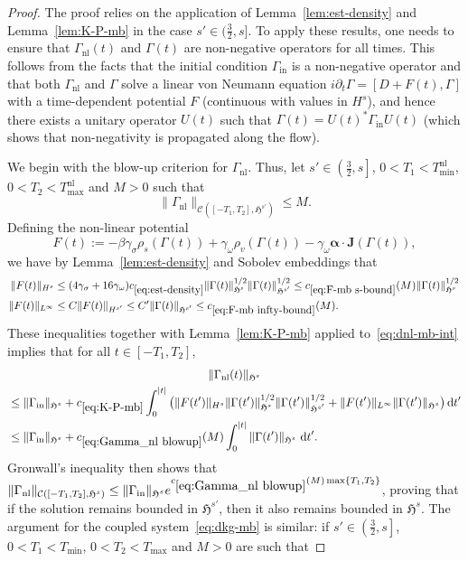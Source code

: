 \documentclass[AHL,Unicode,longabstracts,published]{cedram}
\newcommand{\rmin}{\mathrm{in}}
\newcommand{\nl}{\mathrm{nl}}
\newcommand{\cC}{\mathcal{C}}
\newcommand{\gH}{\mathfrak{H}}
\newcommand\ii{{\ensuremath {\infty}}}
\renewcommand\d[1]{{\ensuremath{\,\text{d}#1}}}
\begin{document}
\begin{proof}
The proof relies on the application of Lemma~\ref{lem:est-density} and Lemma~\ref{lem:K-P-mb} in the case $s'\in(\tfrac32,s]$. To apply these results, one needs to ensure that $\Gamma_{\nl}(t)$ and $\Gamma(t)$ are non-negative operators for all times. This follows from the facts that the initial condition $\Gamma_\rmin$ is a non-negative operator and that both $\Gamma_{\nl}$ and $\Gamma$ solve a linear von Neumann equation $i\partial_t\Gamma=[D+F(t),\Gamma]$ with a time-dependent potential $F$ (continuous with values in $H^s$), and hence there exists a unitary operator $U(t)$ such that $\Gamma(t)=U(t)^*\Gamma_\rmin U(t)$ (which shows that non-negativity is propagated along the flow).

We begin with the blow-up criterion for $\Gamma_{\nl}$. Thus, let $s'\in\left(\tfrac32,s\right]$, $0<T_1<T_{\min}^{\nl}$, $0<T_2<T_{\max}^{\nl}$ and $M>0$ such that
\[
\|\Gamma_{\nl}\|_{\cC\left([-T_1,T_2],\gH^{s'}\right)}\leq M.
\]
Defining the non-linear potential
\[
F(t):=- { \beta}\gamma_\sigma \rho_s(\Gamma(t)) + \gamma_\omega \rho_v(\Gamma(t)) - \gamma_\omega {\bm \alpha}\cdot {\bm J}(\Gamma(t)),
\]
we have by Lemma~\ref{lem:est-density} and Sobolev embeddings that
\begin{align}
\|F(t)\|_{H^s}&\leq (4\gamma_\sigma + 16 \gamma_\omega) c_{\eqref{eq:est-density}}\|\Gamma(t)\|_{\gH^s}^{1/2}\|\Gamma(t)\|_{\gH^{s'}}^{1/2}
\leq c_{\eqref{eq:F-mb s-bound}}(M)\|\Gamma(t)\|_{\gH^s}^{1/2} \label{eq:F-mb s-bound}
\,\\
\|F(t)\|_{L^\ii}&\leq C\|F(t)\|_{H^{s'}}\leq C'\|\Gamma(t)\|_{\gH^{s'}}\leq c_{\eqref{eq:F-mb infty-bound}}(M) \label{eq:F-mb infty-bound}
.
\end{align}
These inequalities together with Lemma~\ref{lem:K-P-mb} applied to~\eqref{eq:dnl-mb-int} implies that for all $t\in[-T_1,T_2]$,
\begin{multline}\label{eq:Gamma_nl blowup}
\|\Gamma_{\nl}(t)\|_{\gH^s}\\
\begin{aligned}
&\leq
\|\Gamma_{\rmin}\|_{\gH^s}+c_{\eqref{eq:K-P-mb}}\int_0^{|t|}\big(\|F(t')\|_{H^s} \|\Gamma(t')\|_{\gH^s}^{1/2} \|\Gamma(t')\|_{\gH^{s'}}^{1/2} + \|F(t')\|_{L^\infty} \|\Gamma(t')\|_{\gH^s} \big)\d t'\\
&\leq \|\Gamma_{\rmin}\|_{\gH^s}+c_{\eqref{eq:Gamma_nl blowup}}(M)\int_0^{|t|}\|\Gamma(t')\|_{\gH^s}\,\d t'. 
\end{aligned}
\end{multline}
Gronwall's inequality then shows that $\|\Gamma_{\nl}\|_{\cC([-T_1,T_2],\gH^{s})}\leq \|\Gamma_{\rmin}\|_{\gH^s} e^{c_{\eqref{eq:Gamma_nl blowup}}(M) \max\{T_1,T_2\}}$, proving that if the solution remains bounded in $\gH^{s'}$, then it also remains bounded in $\gH^s$. The argument for the coupled system~\eqref{eq:dkg-mb} is similar: if $s'\in\left(\tfrac32,s\right]$, $0<T_1<T_{\min}$, $0<T_2<T_{\max}$ and $M>0$ are such that

\end{proof}
\end{document}
